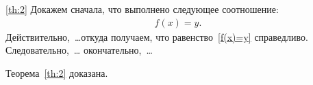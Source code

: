 \documentclass[12pt]{a&t}
\begin{document}
\begin{comment}
\section{Четвертый раздел}

Данный раздел содержит несколько примеров различных окружений.

\begin{example}
Хххххххххххххх хххххххххххххх х хххххххххххххх ххх ххххххх хххх.
Хххххххххххххх хххххххххххххх х хххххххххххххх ххх ххххххх хххх.

Некоторые перечни можно нумеровать русскими буквами:
\begin{ruslist} %
\item
ххххххххххххх хххххххххххххх х хххххххххххххх ххх ххххххх хх
ххххххххххххх хххххххххххххх х хххххххххххххх ххх ххххххх хххх;

\item
ххххххххххххх хххххххххххххх х хххххххххххххх ххх ххххххх хххх.
\end{ruslist}

А некоторые можно~"--- и латинскими буквами:

\begin{latlist} %
\item
ххххххххххх ххх ххххххх хххх;

\item
хххххххххххх ххх ххххххх хххх.
\end{latlist}
Ххххххххххх хххххххххххххх х хххххххххххххх ххх ххххххх хххх.
Ххххххххххх хххххххххххххх х хххххххххххххх ххх ххххххх хххх.
\end{example}

Можно сформулировать утвеждение.

\begin{statement}
Ххххххххххх хххххххххххххх х хххххххххххххх ххх ххххххх хххх.
Ххххххххххх хххххххххххххх х хххххххххххххх ххх ххххххх хххх.
\end{statement}

Можно сформулировать предложение.

\begin{proposition}
Ххххххххххх хххххххххххххх х хххххххххххххх ххх ххххххх хххх.
Ххххххххххх хххххххххххххх х хххххххххххххх ххх ххххххх хххх.
\end{proposition}
\end{comment}

\begin{proofoftheorem}{\ref{th:2}}
Докажем сначала, что выполнено следующее соотношение:
\begin{gather} \label{f(x)=y}
    f(x)=y.
\end{gather}
Действительно,~\dots откуда получаем, что
равенство~\eqref{f(x)=y} справедливо. Следовательно,~\dots
окончательно,~\dots

Теорема~\ref{th:2} доказана.
\end{proofoftheorem}
\end{document}
